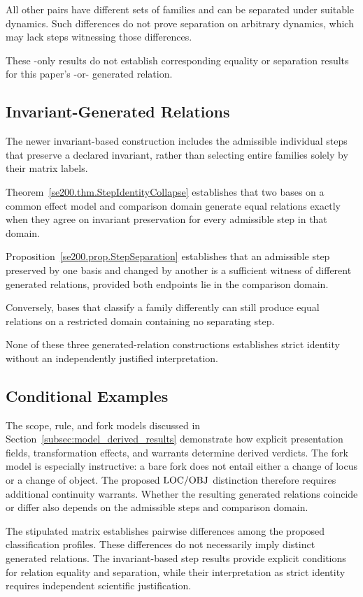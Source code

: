 All other pairs have different sets of
\PRS{} families and can be separated under suitable dynamics.
Such differences do not prove separation on arbitrary dynamics,
which may lack steps witnessing those differences.

These \PRS-only results do not establish corresponding
equality or separation results for this paper's
\PRS{}-or-\NEU{} generated relation.

\subsection{Invariant-Generated Relations}

The newer invariant-based construction includes the admissible
individual steps that preserve a declared invariant, rather than
selecting entire families solely by their matrix labels.

Theorem~\ref{se200.thm.StepIdentityCollapse} establishes that
two bases on a common effect model and comparison domain
generate equal relations exactly when they agree on invariant
preservation for every admissible step in that domain.

Proposition~\ref{se200.prop.StepSeparation} establishes that
an admissible step preserved by one basis and changed by another
is a sufficient witness of different generated relations,
provided both endpoints lie in the comparison domain.

Conversely, bases that classify a family differently can still
produce equal relations on a restricted domain containing no
separating step.

None of these three generated-relation constructions establishes
strict identity without an independently justified interpretation.

\subsection{Conditional Examples}

The scope, rule, and fork models discussed in
Section~\ref{subsec:model_derived_results} demonstrate how
explicit presentation fields, transformation effects, and
warrants determine derived verdicts.
The fork model is especially instructive: a bare fork does
not entail either a change of locus or a change of object.
The proposed $\mathrm{LOC}/\mathrm{OBJ}$ distinction therefore requires
additional continuity warrants.
Whether the resulting generated relations coincide or differ
also depends on the admissible steps and comparison domain.

The stipulated matrix establishes pairwise differences among
the proposed classification profiles.
These differences do not necessarily imply distinct generated
relations.
The invariant-based step results provide explicit conditions
for relation equality and separation, while their interpretation
as strict identity requires independent scientific justification.
